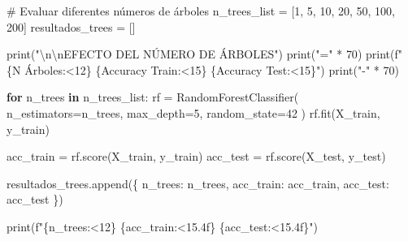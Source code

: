 \documentclass[
  doc,
  floatsintext,
  longtable,
  a4paper,
  nolmodern,
  notxfonts,
  notimes,
  12pt,
  colorlinks=true,linkcolor=blue,citecolor=blue,urlcolor=blue]{apa7}
\newenvironment{Shaded}{\begin{snugshade}}{\end{snugshade}}
\newcommand{\BuiltInTok}[1]{\textcolor[rgb]{0.00,0.23,0.31}{#1}}
\newcommand{\CharTok}[1]{\textcolor[rgb]{0.13,0.47,0.30}{#1}}
\newcommand{\CommentTok}[1]{\textcolor[rgb]{0.37,0.37,0.37}{#1}}
\newcommand{\ControlFlowTok}[1]{\textcolor[rgb]{0.00,0.23,0.31}{\textbf{#1}}}
\newcommand{\DecValTok}[1]{\textcolor[rgb]{0.68,0.00,0.00}{#1}}
\newcommand{\KeywordTok}[1]{\textcolor[rgb]{0.00,0.23,0.31}{\textbf{#1}}}
\newcommand{\NormalTok}[1]{\textcolor[rgb]{0.00,0.23,0.31}{#1}}
\newcommand{\OperatorTok}[1]{\textcolor[rgb]{0.37,0.37,0.37}{#1}}
\newcommand{\SpecialCharTok}[1]{\textcolor[rgb]{0.37,0.37,0.37}{#1}}
\newcommand{\SpecialStringTok}[1]{\textcolor[rgb]{0.13,0.47,0.30}{#1}}
\newcommand{\StringTok}[1]{\textcolor[rgb]{0.13,0.47,0.30}{#1}}
\begin{document}
\begin{Shaded}
\begin{Highlighting}[]
\CommentTok{\# Evaluar diferentes números de árboles}
\NormalTok{n\_trees\_list }\OperatorTok{=}\NormalTok{ [}\DecValTok{1}\NormalTok{, }\DecValTok{5}\NormalTok{, }\DecValTok{10}\NormalTok{, }\DecValTok{20}\NormalTok{, }\DecValTok{50}\NormalTok{, }\DecValTok{100}\NormalTok{, }\DecValTok{200}\NormalTok{]}
\NormalTok{resultados\_trees }\OperatorTok{=}\NormalTok{ []}

\BuiltInTok{print}\NormalTok{(}\StringTok{"}\CharTok{\textbackslash{}n\textbackslash{}n}\StringTok{EFECTO DEL NÚMERO DE ÁRBOLES"}\NormalTok{)}
\BuiltInTok{print}\NormalTok{(}\StringTok{"="} \OperatorTok{*} \DecValTok{70}\NormalTok{)}
\BuiltInTok{print}\NormalTok{(}\SpecialStringTok{f"}\SpecialCharTok{\{}\StringTok{\textquotesingle{}N Árboles\textquotesingle{}}\SpecialCharTok{:\textless{}12\}}\SpecialStringTok{ }\SpecialCharTok{\{}\StringTok{\textquotesingle{}Accuracy Train\textquotesingle{}}\SpecialCharTok{:\textless{}15\}}\SpecialStringTok{ }\SpecialCharTok{\{}\StringTok{\textquotesingle{}Accuracy Test\textquotesingle{}}\SpecialCharTok{:\textless{}15\}}\SpecialStringTok{"}\NormalTok{)}
\BuiltInTok{print}\NormalTok{(}\StringTok{"{-}"} \OperatorTok{*} \DecValTok{70}\NormalTok{)}

\ControlFlowTok{for}\NormalTok{ n\_trees }\KeywordTok{in}\NormalTok{ n\_trees\_list:}
\NormalTok{    rf }\OperatorTok{=}\NormalTok{ RandomForestClassifier(}
\NormalTok{        n\_estimators}\OperatorTok{=}\NormalTok{n\_trees,}
\NormalTok{        max\_depth}\OperatorTok{=}\DecValTok{5}\NormalTok{,}
\NormalTok{        random\_state}\OperatorTok{=}\DecValTok{42}
\NormalTok{    )}
\NormalTok{    rf.fit(X\_train, y\_train)}
    
\NormalTok{    acc\_train }\OperatorTok{=}\NormalTok{ rf.score(X\_train, y\_train)}
\NormalTok{    acc\_test }\OperatorTok{=}\NormalTok{ rf.score(X\_test, y\_test)}
    
\NormalTok{    resultados\_trees.append(\{}
        \StringTok{\textquotesingle{}n\_trees\textquotesingle{}}\NormalTok{: n\_trees,}
        \StringTok{\textquotesingle{}acc\_train\textquotesingle{}}\NormalTok{: acc\_train,}
        \StringTok{\textquotesingle{}acc\_test\textquotesingle{}}\NormalTok{: acc\_test}
\NormalTok{    \})}
    
    \BuiltInTok{print}\NormalTok{(}\SpecialStringTok{f"}\SpecialCharTok{\{}\NormalTok{n\_trees}\SpecialCharTok{:\textless{}12\}}\SpecialStringTok{ }\SpecialCharTok{\{}\NormalTok{acc\_train}\SpecialCharTok{:\textless{}15.4f\}}\SpecialStringTok{ }\SpecialCharTok{\{}\NormalTok{acc\_test}\SpecialCharTok{:\textless{}15.4f\}}\SpecialStringTok{"}\NormalTok{)}


\end{Highlighting}
\end{Shaded}
\end{document}
